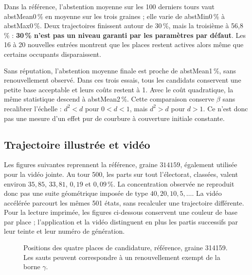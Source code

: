 \documentclass[11pt,a4paper]{article}
\begin{document}
Dans la référence, l'abstention moyenne sur les 100 derniers tours
vaut \csname abstMean0\endcsname\,\% en moyenne sur les trois graines ;
elle varie de \csname abstMin0\endcsname\,\% à
\csname abstMax0\endcsname\,\%. Deux trajectoires finissent autour
de 30\,\%, mais la troisième à 56,8\,\% : \textbf{30\,\% n'est pas
un niveau garanti par les paramètres par défaut}.
Les 16 à 20 nouvelles entrées montrent que les places restent actives
alors même que certains occupants disparaissent.

Sans réputation, l'abstention moyenne finale est proche de
\csname abstMean1\endcsname\,\%, sans renouvellement observé.
Dans ces trois essais, tous les candidats conservent une petite base
acceptable et leurs coûts restent à 1. Avec le coût quadratique,
la même statistique descend à \csname abstMean2\endcsname\,\%.
Cette comparaison conserve $\beta$ sans recalibrer l'échelle :
$d^2<d$ pour $0<d<1$, mais $d^2>d$ pour $d>1$.
Ce n'est donc pas une mesure d'un effet pur de courbure à couverture
initiale constante.

\subsection{Trajectoire illustrée et vidéo}
Les figures suivantes reprennent la référence, graine $314159$,
également utilisée pour la vidéo jointe. Au tour 500, les parts sur
tout l'électorat, classées, valent environ
$35{,}85$, $33{,}81$, $0{,}19$ et $0{,}09$\,\%.
La concentration observée ne reproduit donc pas une suite géométrique
imposée de type $40,20,10,5,\ldots$.
La vidéo accélérée parcourt les mêmes 501 états, sans recalculer une
trajectoire différente.
Pour la lecture imprimée, les figures ci-dessous conservent une couleur
de base par place ; l'application et la vidéo distinguent en plus les
partis successifs par leur teinte et leur numéro de génération.

\begin{figure}[htbp]\centering
{}
\caption{Positions des quatre places de candidature, référence, graine 314159.
Les sauts peuvent correspondre à un renouvellement exempt de la borne $\gamma$.}
\end{figure}
\end{document}
